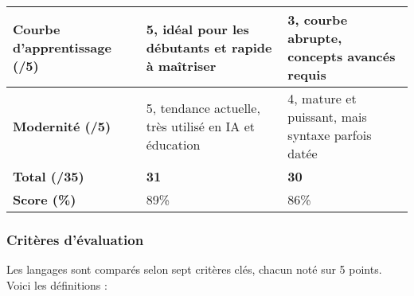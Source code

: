 \begin{longtable}{|p{}|p{}|p{}|}
\textbf{Courbe d’apprentissage (/5)} & 
5, idéal pour les débutants et rapide à maîtriser & 
3, courbe abrupte, concepts avancés requis \\
\hline

\textbf{Modernité (/5)} & 
5, tendance actuelle, très utilisé en IA et éducation & 
4, mature et puissant, mais syntaxe parfois datée \\
\hline

\textbf{Total (/35)} & 
\textbf{31} & 
\textbf{30} \\
\hline

\textbf{Score (\%)} & 
89\% & 
86\% \\
\hline

\end{longtable}


\subsubsection{Critères d’évaluation}
Les langages sont comparés selon sept critères clés, chacun noté sur 5 points. 
Voici les définitions :

